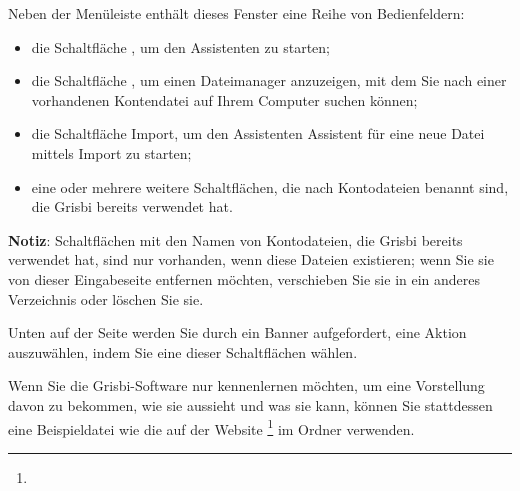 
Neben der Menüleiste enthält dieses Fenster eine Reihe von Bedienfeldern:%
\begin{itemize}
	\item die Schaltfläche , um den Assistenten  zu starten;%
	\item die Schaltfläche , um einen Dateimanager anzuzeigen, mit dem Sie nach einer vorhandenen Kontendatei auf Ihrem Computer suchen können;%
	\item die Schaltfläche {Import}, um den Assistenten {Assistent für eine neue Datei mittels Import} zu starten;%
	\item eine oder mehrere weitere Schaltflächen, die nach Kontodateien benannt sind, die Grisbi bereits verwendet hat.%
\end{itemize}


\textbf{Notiz}: Schaltflächen mit den Namen von Kontodateien, die Grisbi bereits verwendet hat, sind nur vorhanden, wenn diese Dateien existieren; wenn Sie sie von dieser Eingabeseite entfernen möchten, verschieben Sie sie in ein anderes Verzeichnis oder löschen Sie sie.%


Unten auf der Seite werden Sie durch ein Banner aufgefordert, eine Aktion auszuwählen, indem Sie eine dieser Schaltflächen wählen.%


Wenn Sie die Grisbi-Software nur kennenlernen möchten, um eine Vorstellung davon zu bekommen, wie sie aussieht und was sie kann, können Sie stattdessen eine Beispieldatei wie die auf der Website \footnote{\urlSourceForgeDocumentation{}} im Ordner  verwenden.%

